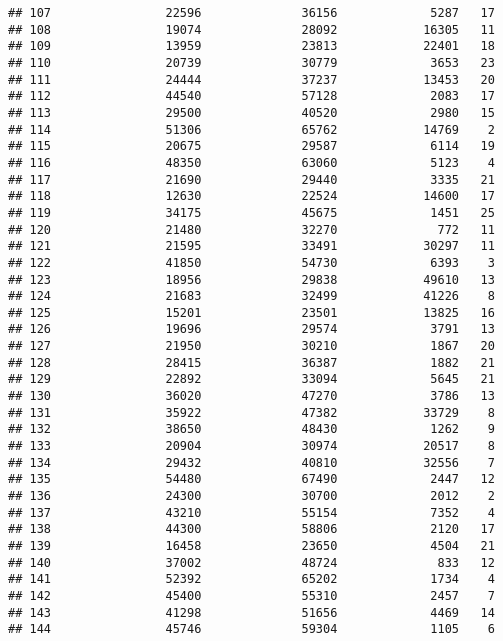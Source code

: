 \documentclass[
]{article}
\begin{document}
\begin{verbatim}
## 107                22596              36156             5287   17
## 108                19074              28092            16305   11
## 109                13959              23813            22401   18
## 110                20739              30779             3653   23
## 111                24444              37237            13453   20
## 112                44540              57128             2083   17
## 113                29500              40520             2980   15
## 114                51306              65762            14769    2
## 115                20675              29587             6114   19
## 116                48350              63060             5123    4
## 117                21690              29440             3335   21
## 118                12630              22524            14600   17
## 119                34175              45675             1451   25
## 120                21480              32270              772   11
## 121                21595              33491            30297   11
## 122                41850              54730             6393    3
## 123                18956              29838            49610   13
## 124                21683              32499            41226    8
## 125                15201              23501            13825   16
## 126                19696              29574             3791   13
## 127                21950              30210             1867   20
## 128                28415              36387             1882   21
## 129                22892              33094             5645   21
## 130                36020              47270             3786   13
## 131                35922              47382            33729    8
## 132                38650              48430             1262    9
## 133                20904              30974            20517    8
## 134                29432              40810            32556    7
## 135                54480              67490             2447   12
## 136                24300              30700             2012    2
## 137                43210              55154             7352    4
## 138                44300              58806             2120   17
## 139                16458              23650             4504   21
## 140                37002              48724              833   12
## 141                52392              65202             1734    4
## 142                45400              55310             2457    7
## 143                41298              51656             4469   14
## 144                45746              59304             1105    6

\end{verbatim}
\end{document}
